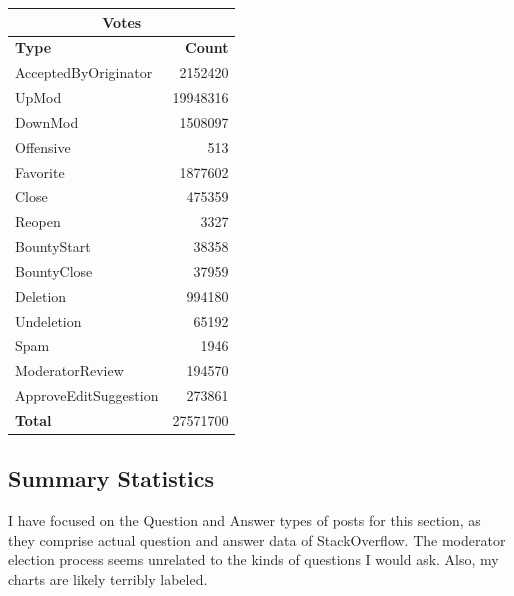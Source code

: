 \documentclass{article}
\begin{document}
\begin{table}[h]
\begin{minipage}[t]{0.45\linewidth}
\begin{tabular}[t]{| l | r |}
\hline
\multicolumn{2}{|c|}{Votes} \\ \hline
\bf{Type} & \bf{Count} \\ \hline
AcceptedByOriginator& 2152420  \\ \hline    
UpMod& 19948316  \\ \hline    
DownMod& 1508097 \\ \hline    
Offensive& 513 \\ \hline    
Favorite& 1877602 \\ \hline    
Close& 475359 \\ \hline    
Reopen& 3327 \\ \hline    
BountyStart& 38358 \\ \hline    
BountyClose& 37959 \\ \hline    
Deletion& 994180 \\ \hline    
Undeletion& 65192 \\ \hline    
Spam& 1946 \\ \hline    
ModeratorReview& 194570 \\ \hline    
ApproveEditSuggestion& 273861 \\ \hline 
\bf{Total} & 27571700 \\ \hline   
\end{tabular}
\end{minipage}
\end{table}

\subsection{Summary Statistics}

I have focused on the Question and Answer types of posts for this section, as they comprise actual question and answer data of StackOverflow. The moderator election process seems unrelated to the kinds of questions I would ask. Also, my charts are likely terribly labeled.
\end{document}
